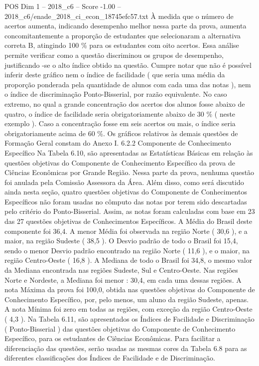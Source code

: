\begin{textsample}{POS Dim 1 – 2018\_c6 – Score -1.00 – 2018\_c6/enade\_2018\_ci\_econ\_18745efc57.txt}
À medida que o número de acertos aumenta, indicando desempenho melhor nessa parte da prova, aumenta concomitantemente a proporção de estudantes que selecionaram a alternativa correta B, atingindo 100 \% para os estudantes com oito acertos.
Essa análise permite verificar como a questão discriminou os grupos de desempenho, justificando -se o alto índice obtido na questão.
Cumpre notar que não é possível inferir deste gráfico nem o índice de facilidade ( que seria uma média da proporção ponderada pela quantidade de alunos com cada uma das notas ), nem o índice de discriminação Ponto-Bisserial, por razão equivalente.
No caso extremo, no qual a grande concentração dos acertos dos alunos fosse abaixo de quatro, o índice de facilidade seria obrigatoriamente abaixo de 30 \% ( neste exemplo ).
Caso a concentração fosse em seis acertos ou mais, o índice seria obrigatoriamente acima de 60 \%.
Os gráficos relativos às demais questões de Formação Geral constam do Anexo I. 6.2.2 Componente de Conhecimento Específico Na Tabela 6.10, são apresentadas as Estatísticas Básicas em relação às questões objetivas do Componente de Conhecimento Específico da prova de Ciências Econômicas por Grande Região.
Nessa parte da prova, nenhuma questão foi anulada pela Comissão Assessora da Área.
Além disso, como será discutido ainda nesta seção, quatro questões objetivas do Componente de Conhecimentos Específicos não foram usadas no cômputo das notas por terem sido descartadas pelo critério do Ponto-Bisserial.
Assim, as notas foram calculadas com base em 23 das 27 questões objetivas de Conhecimentos Específicos.
A Média do Brasil deste componente foi 36,4.
A menor Média foi observada na região Norte ( 30,6 ), e a maior, na região Sudeste ( 38,5 ).
O Desvio padrão de todo o Brasil foi 15,4, sendo o menor Desvio padrão encontrado na região Norte ( 11,6 ), e o maior, na região Centro-Oeste ( 16,8 ).
A Mediana de todo o Brasil foi 34,8, o mesmo valor da Mediana encontrada nas regiões Sudeste, Sul e Centro-Oeste.
Nas regiões Norte e Nordeste, a Mediana foi menor : 30,4, em cada uma dessas regiões.
A nota Máxima da prova foi 100,0, obtida nas questões objetivas do Componente de Conhecimento Específico, por, pelo menos, um aluno da região Sudeste, apenas.
A nota Mínima foi zero em todas as regiões, com exceção da região Centro-Oeste ( 4,3 ).
Na Tabela 6.11, são apresentados os Índices de Facilidade e Discriminação ( Ponto-Bisserial ) das questões objetivas do Componente de Conhecimento Específico, para os estudantes de Ciências Econômicas.
Para facilitar a diferenciação das questões, serão usadas as mesmas cores da Tabela 6.8 para as diferentes classificações dos Índices de Facilidade e de Discriminação.

\end{textsample}
